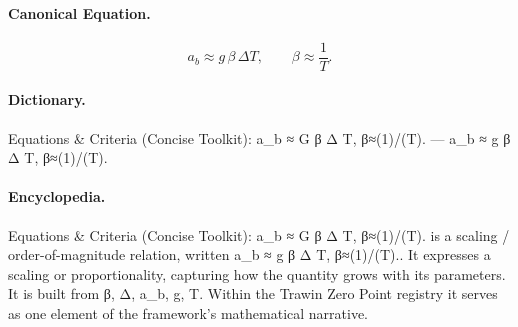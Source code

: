 \paragraph{Canonical Equation.}
\[
a_b \approx g\,\beta\,\Delta T, \qquad \beta\approx\frac{1}{T}.
\]

\paragraph{Dictionary.}
Equations \& Criteria (Concise Toolkit): a\_b ≈ G β Δ T, β≈(1)/(T). — a\_b ≈ g β Δ T, β≈(1)/(T).

\paragraph{Encyclopedia.}
Equations \& Criteria (Concise Toolkit): a\_b ≈ G β Δ T, β≈(1)/(T). is a scaling / order-of-magnitude relation, written a\_b ≈ g β Δ T, β≈(1)/(T).. It expresses a scaling or proportionality, capturing how the quantity grows with its parameters. It is built from β, Δ, a\_b, g, T. Within the Trawin Zero Point registry it serves as one element of the framework's mathematical narrative.
